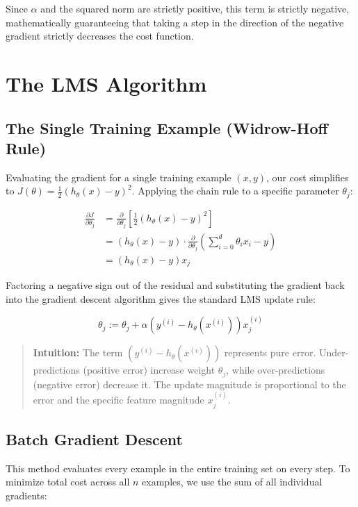 \documentclass[12pt, a4paper]{report}
\begin{document}
Since $\alpha$ and the squared norm are strictly positive, this term is strictly negative, mathematically guaranteeing that taking a step in the direction of the negative gradient strictly decreases the cost function.

\section{The LMS Algorithm}

\subsection{The Single Training Example (Widrow-Hoff Rule)}

Evaluating the gradient for a single training example $(x, y)$, our cost simplifies to $J(\theta) = \frac{1}{2} (h_\theta(x) - y)^2$. Applying the chain rule to a specific parameter $\theta_j$:

\begin{align*} 
\frac{\partial J}{\partial \theta_j} &= \frac{\partial}{\partial \theta_j} \left[ \frac{1}{2} (h_\theta(x) - y)^2 \right] \\ 
&= (h_\theta(x) - y) \cdot \frac{\partial}{\partial \theta_j} \left( \sum_{i=0}^d \theta_i x_i - y \right) \\ 
&= (h_\theta(x) - y) x_j 
\end{align*}

Factoring a negative sign out of the residual and substituting the gradient back into the gradient descent algorithm gives the standard LMS update rule:

\[ \theta_j := \theta_j + \alpha \left( y^{(i)} - h_\theta(x^{(i)}) \right) x_j^{(i)} \]

\begin{quote}
\textbf{Intuition:} The term $(y^{(i)} - h_\theta(x^{(i)}))$ represents pure error. Under-predictions (positive error) increase weight $\theta_j$, while over-predictions (negative error) decrease it. The update magnitude is proportional to the error and the specific feature magnitude $x_j^{(i)}$.
\end{quote}

\subsection{Batch Gradient Descent}

This method evaluates every example in the entire training set on every step. To minimize total cost across all $n$ examples, we use the sum of all individual gradients:
\end{document}

